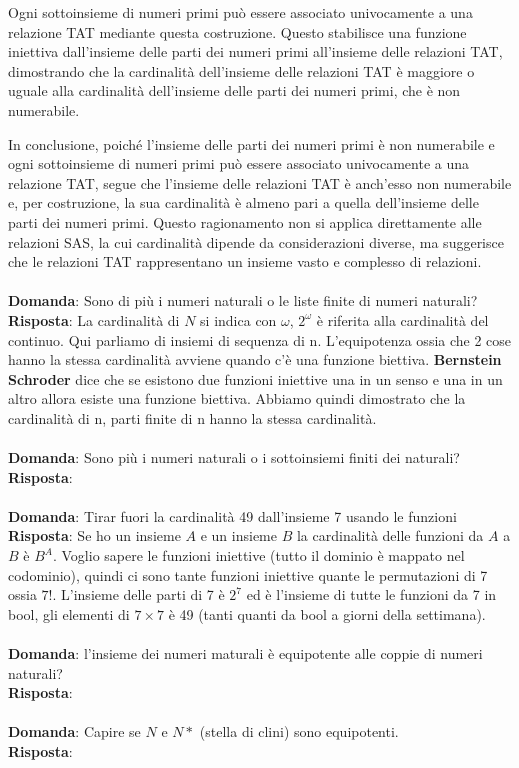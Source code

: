 \documentclass{article}
\begin{document}
Ogni sottoinsieme di numeri primi può essere associato univocamente a una relazione TAT mediante questa costruzione. Questo stabilisce una funzione iniettiva dall'insieme delle parti dei numeri primi all'insieme delle relazioni TAT, dimostrando che la cardinalità dell'insieme delle relazioni TAT è maggiore o uguale alla cardinalità dell'insieme delle parti dei numeri primi, che è non numerabile.

In conclusione, poiché l'insieme delle parti dei numeri primi è non numerabile e ogni sottoinsieme di numeri primi può essere associato univocamente a una relazione TAT, segue che l'insieme delle relazioni TAT è anch'esso non numerabile e, per costruzione, la sua cardinalità è almeno pari a quella dell'insieme delle parti dei numeri primi. Questo ragionamento non si applica direttamente alle relazioni SAS, la cui cardinalità dipende da considerazioni diverse, ma suggerisce che le relazioni TAT rappresentano un insieme vasto e complesso di relazioni. \\ \\
\textbf{Domanda}: Sono di più i numeri naturali o le liste finite di numeri naturali? \\
\textbf{Risposta}: La cardinalità di $N$ si indica con $\omega$, $2^\omega$ è riferita alla cardinalità del continuo. Qui parliamo di insiemi di sequenza di n.
L'equipotenza ossia che 2 cose hanno la stessa cardinalità avviene quando c'è una funzione biettiva. \textbf{Bernstein Schroder} dice che se esistono due funzioni iniettive una in un senso e una in un altro allora esiste una funzione biettiva. Abbiamo quindi dimostrato che la cardinalità di n, parti finite di n hanno la stessa cardinalità. \\ \\
\textbf{Domanda}: Sono più i numeri naturali o i sottoinsiemi finiti dei naturali?
\textbf{Risposta}: \\ \\
\textbf{Domanda}: Tirar fuori la cardinalità 49 dall’insieme 7 usando le funzioni \\
\textbf{Risposta}: Se ho un insieme $A$ e un insieme $B$ la cardinalità delle funzioni da $A$ a $B$ è $B^A$. Voglio sapere le funzioni iniettive (tutto il dominio è mappato nel codominio), quindi ci sono tante funzioni iniettive quante le permutazioni di 7 ossia $7!$. L'insieme delle parti di 7 è $2^7$ ed è l'insieme di tutte le funzioni da 7 in bool, gli elementi di $7 \times 7$ è 49 (tanti quanti da bool a giorni della settimana). \\ \\
\textbf{Domanda}: l'insieme dei numeri maturali è equipotente alle coppie di numeri naturali? \\
\textbf{Risposta}: \\ \\
\textbf{Domanda}: Capire se $N$ e $N*$ (stella di clini) sono equipotenti. \\
\textbf{Risposta}: \\ \\
\end{document}
